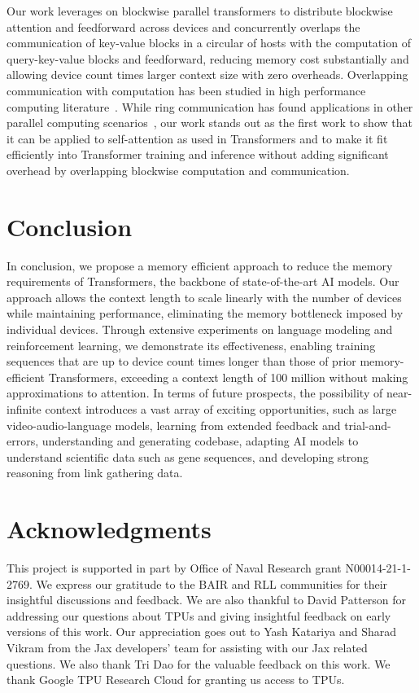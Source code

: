 \documentclass{article}
\newif\ifanonymous
\begin{document}
Our work leverages on blockwise parallel transformers to distribute blockwise attention and feedforward across devices and concurrently overlaps the communication of key-value blocks in a circular of hosts with the computation of query-key-value blocks and feedforward, reducing memory cost substantially and allowing device count times larger context size with zero overheads.
Overlapping communication with computation has been studied in high performance computing literature~\citep[][\textit{inter alia}]{danalis2005transformations, wang2022overlap, danalis2009mpi}.
While ring communication has found applications in other parallel computing scenarios~\citep{bischof2008parallel,hursey2011building,gibiansky2017bringing,sergeev2018horovod}, our work stands out as the first work to show that it can be applied to self-attention as used in Transformers and to make it fit efficiently into Transformer training and inference without adding significant overhead by overlapping blockwise computation and communication.


\section{Conclusion}
In conclusion, we propose a memory efficient approach to reduce the memory requirements of Transformers, the backbone of state-of-the-art AI models.
Our approach allows the context length to scale linearly with the number of devices while maintaining performance, eliminating the memory bottleneck imposed by individual devices.
Through extensive experiments on language modeling and reinforcement learning, we demonstrate its effectiveness, enabling training sequences that are up to device count times longer than those of prior memory-efficient Transformers, exceeding a context length of 100 million without making approximations to attention.
In terms of future prospects, the possibility of near-infinite context introduces a vast array of exciting opportunities, such as large video-audio-language models, learning from extended feedback and trial-and-errors, understanding and generating codebase, adapting AI models to understand scientific data such as gene sequences, and developing strong reasoning from link gathering data.

\ifanonymous
\else
\section*{Acknowledgments}
This project is supported in part by Office of Naval Research grant N00014-21-1-2769.
We express our gratitude to the BAIR and RLL communities for their insightful discussions and feedback.
We are also thankful to David Patterson for addressing our questions about TPUs and giving insightful feedback on early versions of this work. Our appreciation goes out to Yash Katariya and Sharad Vikram from the Jax developers' team for assisting with our Jax related questions.
We also thank Tri Dao for the valuable feedback on this work.
We thank Google TPU Research Cloud for granting us access to TPUs.
\fi
\end{document}
